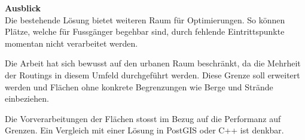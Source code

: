 
\textbf{Ausblick}~\\
Die bestehende Lösung bietet weiteren Raum für Optimierungen. So können Plätze, welche für Fussgänger begehbar sind, durch fehlende Eintrittspunkte momentan nicht verarbeitet werden.

Die Arbeit hat sich bewusst auf den urbanen Raum beschränkt, da die Mehrheit der Routings in diesem Umfeld durchgeführt werden. Diese Grenze soll erweitert werden und Flächen ohne konkrete Begrenzungen wie Berge und Strände einbeziehen.

Die Vorverarbeitungen der Flächen stosst im Bezug auf die Performanz auf Grenzen. Ein Vergleich mit einer Lösung in PostGIS oder C++ ist denkbar.